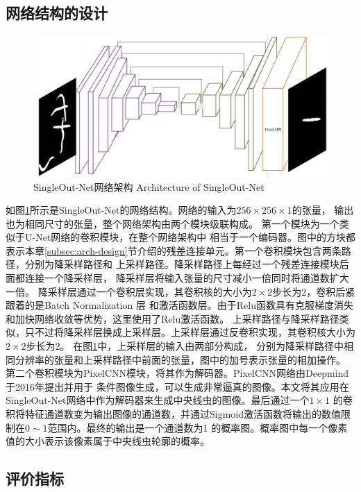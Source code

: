 \subsection{网络结构的设计}
\label{archtecture}
\begin{figure}[htb]
	  \centering
	  \includegraphics[width=14cm]{figure/chap4/arch1.jpg}
	  \bicaption
		{SingleOut-Net网络架构}
		{Architecture of SingleOut-Net}
	  \label{fig:chap4:netarch}
	\end{figure}
	如图\ref{fig:chap4:netarch}所示是SingleOut-Net的网络结构。网络的输入为$256\times256\times1$的张量，
	输出也为相同尺寸的张量，整个网络架构由两个模块级联构成。
	第一个模块为一个类似于U-Net网络\cite{ronneberger2015u}的卷积模块，在整个网络架构中
	相当于一个编码器。图中的方块都表示本章\ref{subsec:arch-design}节介绍的残差连接单元。第一个卷积模块包含两条路径，分别为降采样路径和
	上采样路径。降采样路径上每经过一个残差连接模块后面都连接一个降采样层，
	降采样层将输入张量的尺寸减小一倍同时将通道数扩大一倍。
	降采样层通过一个卷积层实现，其卷积核的大小为$2\times2$步长为2，卷积后紧跟着的是Batch Normalization 层
	和激活函数层。由于Relu函数\cite{xu2015empirical}具有克服梯度消失和加快网络收敛等优势，这里使用了Relu激活函数。
	上采样路径与降采样路径类似，只不过将降采样层换成上采样层。上采样层通过反卷积实现，其卷积核大小为$2\times2$步长为2。
	在图\ref{fig:chap4:netarch}中，上采样层的输入由两部分构成，
	分别为降采样路径中相同分辨率的张量和上采样路径中前面的张量，图中的加号表示张量的相加操作。
	第二个卷积模块为PixelCNN\cite{van2016conditional}模块，将其作为解码器。PixelCNN网络由Deepmind于2016年提出并用于
	条件图像生成，可以生成非常逼真的图像。本文将其应用在SingleOut-Net网络中作为解码器来生成中央线虫的图像。最后通过一个$1\times1$
	的卷积将特征通道数变为输出图像的通道数，并通过Sigmoid激活函数将输出的数值限制在$0\sim1$范围内。最终的输出是一个通道数为1
	的概率图。概率图中每一个像素值的大小表示该像素属于中央线虫轮廓的概率。

\subsection{评价指标}
	
